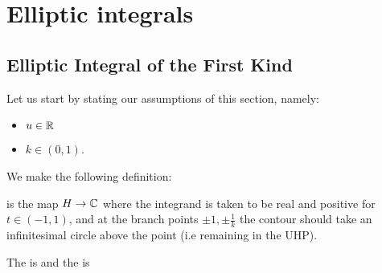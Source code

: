 \documentclass{article}
\begin{document}
\section{Elliptic integrals}


\subsection{Elliptic Integral of the First Kind}
Let us start by stating our assumptions of this section, namely:
\begin{itemize}
	\item $u \in \mathbb{R}$
	\item $k \in (0,1)$.
\end{itemize}

We make the following definition:

\begin{definition}
	 is the map $H\to \mathbb{C}$
where the integrand is taken to be real and positive for $t \in (-1,1)$, and at the branch points $\pm 1, \pm \frac{1}{k}$ the contour should take an infinitesimal circle above the point (i.e remaining in the UHP). 
\end{definition}

\begin{definition}
	The  is 
	and the  is 
\end{definition}
\end{document}
